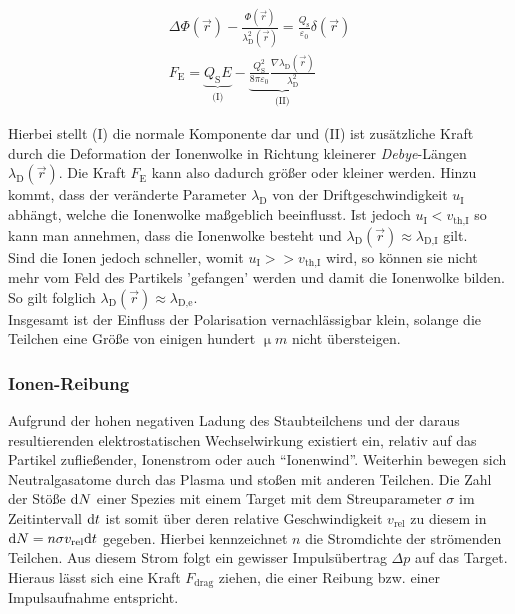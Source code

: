 \documentclass[numbers=noenddot,a4paper]{scrartcl}
\newcommand{\diff}{\textnormal{d}}
\newcommand{\ix}[1]{_\text{#1}}
\newcommand{\tilt}[1]{\textit{#1}}
\begin{document}
				\begin{align}
					\Delta \Phi\left(\vec{r}\right)-\frac{\Phi\left(\vec{r}\right)}{\lambda\ix{D}^2\left(\vec{r}\right)}=\frac{Q\ix{s}}{\varepsilon\ix{0}}\delta\left(\vec{r}\right) \\
					F\ix{E}=\underbrace{Q\ix{S}E}_{\text{(I)}}-\underbrace{\frac{Q\ix{S}^2}{8\pi\varepsilon\ix{0}}\frac{\nabla\lambda\ix{D}\left(\vec{r}\right)}{\lambda\ix{D}^2}}_{\text{(II)}}
				\end{align}

			Hierbei stellt (I) die normale Komponente dar und (II) ist zusätzliche Kraft durch die Deformation der Ionenwolke in Richtung kleinerer \tilt{Debye}-Längen $\lambda\ix{D}\left(\vec{r}\right)$. Die Kraft $F\ix{E}$ kann also dadurch größer oder kleiner werden. Hinzu kommt, dass der veränderte Parameter $\lambda\ix{D}$ von der Driftgeschwindigkeit $u\ix{I}$ abhängt, welche die Ionenwolke maßgeblich beeinflusst. Ist jedoch $u\ix{I}<v\ix{th,I}$ so kann man annehmen, dass die Ionenwolke besteht und $\lambda\ix{D}\left(\vec{r}\right)\approx\lambda\ix{D,I}$ gilt.\\
			Sind die Ionen jedoch schneller, womit $u\ix{I}>>v\ix{th,I}$ wird, so können sie nicht mehr vom Feld des Partikels 'gefangen' werden und damit die Ionenwolke bilden. So gilt folglich $\lambda\ix{D}\left(\vec{r}\right)\approx\lambda\ix{D,e}$.\\
			Insgesamt ist der Einfluss der Polarisation vernachlässigbar klein, solange die Teilchen eine Größe von einigen hundert $\unit{\upmu m}$ nicht übersteigen.

		\subsubsection{Ionen-Reibung}\label{subsub:reibung}

			Aufgrund der hohen negativen Ladung des Staubteilchens und der daraus resultierenden elektrostatischen Wechselwirkung existiert ein, relativ auf das Partikel zufließender, Ionenstrom oder auch "`Ionenwind"'. Weiterhin bewegen sich Neutralgasatome durch das Plasma und stoßen mit anderen Teilchen. Die Zahl der Stöße $\diff N$ einer Spezies mit einem Target mit dem Streuparameter $\sigma$ im Zeitintervall $\diff t$ ist somit über deren relative Geschwindigkeit $v\ix{rel}$ zu diesem in $\diff N=n\sigma v\ix{rel}\diff t$ gegeben. Hierbei kennzeichnet $n$ die Stromdichte der strömenden Teilchen. Aus diesem Strom folgt ein gewisser Impulsübertrag $\Delta p$ auf das Target. Hieraus lässt sich eine Kraft $F\ix{drag}$ ziehen, die einer Reibung bzw. einer Impulsaufnahme entspricht.
\end{document}
